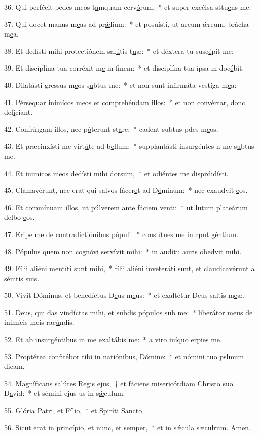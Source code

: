 36. Qui perfécit pedes meos t\uline{a}mquam cerv\uline{ó}rum,~* et super excélsa sttu\uline{e}ns me.\par 
37. Qui docet manus m\uline{e}as ad pr\uline{ǽ}lium:~* et posuísti, ut arcum ǽreum, brácha m\uline{e}a.\par 
38. Et dedísti mihi protectiónem sal\uline{ú}tis t\uline{u}æ:~* et déxtera tu susc\uline{é}pit me:\par 
39. Et disciplína tua corréxit m\uline{e} in f\uline{i}nem:~* et disciplína tua ipsa m doc\uline{é}bit.\par 
40. Dilatásti gressus m\uline{e}os s\uline{u}btus me:~* et non sunt infirmáta vestíga m\uline{e}a:\par 
41. Pérsequar inimícos meos et compreh\uline{é}ndam \uline{i}llos:~* et non convértar, donc def\uline{í}ciant.\par 
42. Confríngam illos, nec p\uline{ó}terunt st\uline{a}re:~* cadent subtus pdes m\uline{e}os.\par 
43. Et præcinxísti me virt\uline{ú}te ad b\uline{e}llum:~* supplantásti insurgéntes n me s\uline{u}btus me.\par 
44. Et inimícos meos dedísti m\uline{i}hi d\uline{o}rsum,~* et odiéntes me disprdid\uline{í}sti.\par 
45. Clamavérunt, nec erat qui salvos fácer\uline{e}t ad D\uline{ó}minum:~* nec exaudvit \uline{e}os.\par 
46. Et commínuam illos, ut púlverem ante f\uline{á}ciem v\uline{e}nti:~* ut lutum plateárum delbo \uline{e}os.\par 
47. Eripe me de contradicti\uline{ó}nibus p\uline{ó}puli:~* constítues me in cput g\uline{é}ntium.\par 
48. Pópulus quem non cognóvi serv\uline{í}vit m\uline{i}hi:~* in audítu auris obedvit m\uline{i}hi.\par 
49. Fílii aliéni ment\uline{í}ti sunt m\uline{i}hi,~* fílii aliéni inveteráti sunt, et claudicavérunt a sémtis s\uline{u}is.\par 
50. Vivit Dóminus, et benedíctus D\uline{e}us m\uline{e}us:~* et exaltétur Deus saltis m\uline{e}æ.\par 
51. Deus, qui das vindíctas mihi, et subdis p\uline{ó}pulos s\uline{u}b me:~* liberátor meus de inimícis meis rac\uline{ú}ndis.\par 
52. Et ab insurgéntibus in me \uline{e}xalt\uline{á}bis me:~* a viro iníquo erpi\uline{e}s me.\par 
53. Proptérea confitébor tibi in nati\uline{ó}nibus, D\uline{ó}mine:~* et nómini tuo pslmum d\uline{i}cam.\par 
54. Magníficans salútes Regis \uline{e}jus,~† et fáciens misericórdiam Christo s\uline{u}o D\uline{a}vid:~* et sémini ejus us in s\uline{ǽ}culum.\par 
55. Glória P\uline{a}tri, et F\uline{í}lio,~* et Spiríti S\uline{a}ncto.\par 
56. Sicut erat in princípio, et n\uline{u}nc, et s\uline{e}mper,~* et in sǽcula sæculrum. \uline{A}men.\par 
